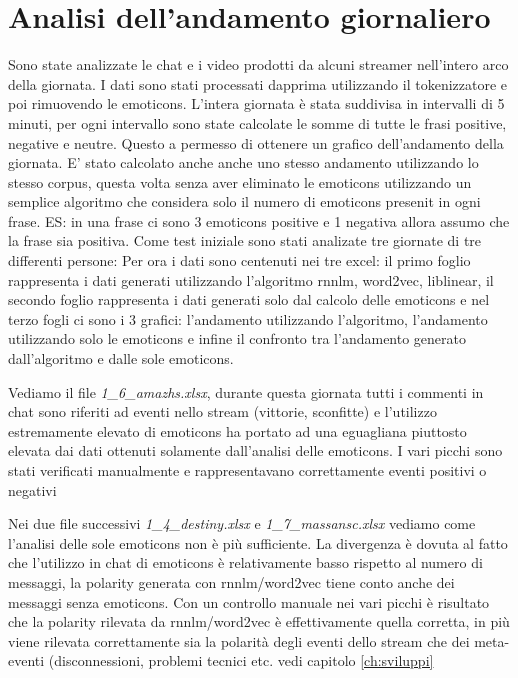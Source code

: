 \documentclass[a4paper,12pt,openright,twoside]{report}
\theoremstyle{definition}
\begin{document}
\section{Analisi dell'andamento giornaliero}
Sono state analizzate le chat e i video prodotti da alcuni streamer nell'intero arco della giornata. I dati sono stati processati dapprima utilizzando il tokenizzatore e poi rimuovendo le emoticons. L'intera giornata è stata suddivisa in intervalli di 5 minuti, per ogni intervallo sono state calcolate le somme di tutte le frasi positive, negative e neutre. Questo a permesso di ottenere un grafico dell'andamento della giornata.
E' stato calcolato anche anche uno stesso andamento utilizzando lo stesso corpus, questa volta senza aver eliminato le emoticons utilizzando un semplice algoritmo che considera solo il numero di emoticons presenit in ogni frase. ES: in una frase ci sono 3 emoticons positive e 1 negativa allora assumo che la frase sia positiva.
Come test iniziale sono stati analizate tre giornate di tre differenti persone:
\newline
\newline
Per ora i dati sono centenuti nei tre excel: il primo foglio rappresenta i dati generati utilizzando l'algoritmo rnnlm, word2vec, liblinear, il secondo foglio rappresenta i dati generati solo dal calcolo delle emoticons e nel terzo fogli ci sono i 3 grafici: l'andamento utilizzando l'algoritmo, l'andamento utilizzando solo le emoticons e infine il confronto tra l'andamento generato dall'algoritmo e dalle sole emoticons.

Vediamo il file \emph{1\_6\_amazhs.xlsx}, durante questa giornata tutti i commenti in chat sono riferiti ad eventi nello stream (vittorie, sconfitte) e l'utilizzo estremamente elevato di emoticons ha portato ad una eguagliana piuttosto elevata dai dati ottenuti solamente dall'analisi delle emoticons. I vari picchi sono stati verificati manualmente e rappresentavano correttamente eventi positivi o negativi

Nei due file successivi \emph{1\_4\_destiny.xlsx} e \emph{1\_7\_massansc.xlsx} vediamo come l'analisi delle sole emoticons non è più sufficiente. La divergenza è dovuta al fatto che l'utilizzo in chat di emoticons è relativamente basso rispetto al numero di messaggi, la polarity generata con rnnlm/word2vec tiene conto anche dei messaggi senza emoticons. Con un controllo manuale nei vari picchi è risultato che la polarity rilevata da rnnlm/word2vec è effettivamente quella corretta, in più viene rilevata correttamente sia la polarità degli eventi dello stream che dei meta-eventi (disconnessioni, problemi tecnici etc. vedi capitolo \ref{ch:sviluppi}
\end{document}
